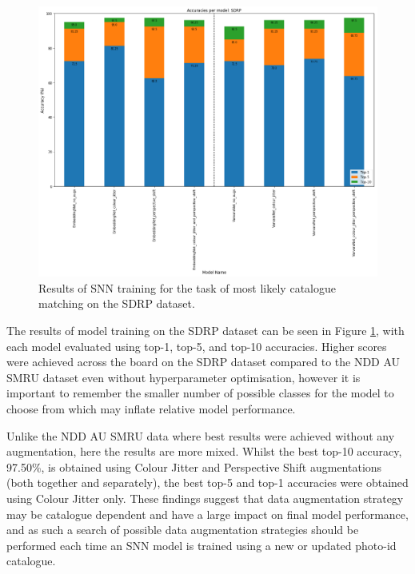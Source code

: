 \begin{figure}[h]
	\begin{center}
		\includegraphics[scale=0.4]{Chapter6/figs/SDRP-normal-split-model-comparison.png}
	\end{center}
	\caption{Results of SNN training for the task of most likely catalogue matching on the SDRP dataset.}
	\label{fig:SDRP-normal-split-model-comparison}
\end{figure}

The results of model training on the SDRP dataset can be seen in Figure \ref{fig:SDRP-normal-split-model-comparison}, with each model evaluated using top-1, top-5, and top-10 accuracies.
Higher scores were achieved across the board on the SDRP dataset compared to the NDD AU SMRU dataset even without hyperparameter optimisation, however it is important to remember the smaller number of possible classes for the model to choose from which may inflate relative model performance.

Unlike the NDD AU SMRU data where best results were achieved without any augmentation, here the results are more mixed. Whilst the best top-10 accuracy, 97.50\%, is obtained using Colour Jitter and Perspective Shift augmentations (both together and separately), the best top-5 and top-1 accuracies were obtained using Colour Jitter only. These findings suggest that data augmentation strategy may be catalogue dependent and have a large impact on final model performance, and as such a search of possible data augmentation strategies should be performed each time an SNN model is trained using a new or updated photo-id catalogue. 

